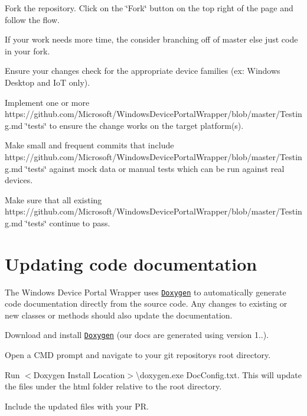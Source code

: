 \begin{DoxyEnumerate}
\item Fork the repository. Click on the \char`\"{}\+Fork\char`\"{} button on the top right of the page and follow the flow.
\item If your work needs more time, the consider branching off of master else just code in your fork.
\item Ensure your changes check for the appropriate device families (ex\+: Windows Desktop and IoT only).
\item Implement one or more https\+://github.com/\+Microsoft/\+Windows\+Device\+Portal\+Wrapper/blob/master/\+Testing.\+md \char`\"{}tests\char`\"{} to ensure the change works on the target platform(s).
\item Make small and frequent commits that include https\+://github.com/\+Microsoft/\+Windows\+Device\+Portal\+Wrapper/blob/master/\+Testing.\+md \char`\"{}tests\char`\"{} against mock data or manual tests which can be run against real devices.
\item Make sure that all existing https\+://github.com/\+Microsoft/\+Windows\+Device\+Portal\+Wrapper/blob/master/\+Testing.\+md \char`\"{}tests\char`\"{} continue to pass.
\end{DoxyEnumerate}

\section*{Updating code documentation}

The Windows Device Portal Wrapper uses \href{http://www.stack.nl/~dimitri/doxygen/download.html}{\tt Doxygen} to automatically generate code documentation directly from the source code. Any changes to existing or new classes or methods should also update the documentation.


\begin{DoxyEnumerate}
\item Download and install \href{http://www.stack.nl/~dimitri/doxygen/download.html}{\tt Doxygen} (our docs are generated using version 1..).
\item Open a C\+MD prompt and navigate to your git repository\textquotesingle{}s root directory.
\item Run \textquotesingle{}$<$Doxygen Install Location$>$\textbackslash{}doxygen.\+exe Doc\+Config.\+txt\textquotesingle{}. This will update the files under the html folder relative to the root directory.
\item Include the updated files with your PR.
\end{DoxyEnumerate}

